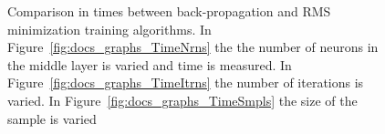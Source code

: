 \documentclass[11pt]{article}
\begin{document}
\begin{figure}[]
	\centering
		   
		
		\caption{Comparison in times between back-propagation and RMS minimization training algorithms. In Figure~\ref{fig:docs_graphs_TimeNrns} the the number of neurons in the middle layer is varied and time is measured. In Figure~\ref{fig:docs_graphs_TimeItrns} the number of iterations is varied. In Figure~\ref{fig:docs_graphs_TimeSmpls} the size of the sample is varied }
	\label{fig:docs_graphs_Time}	
\end{figure}

\end{document}
